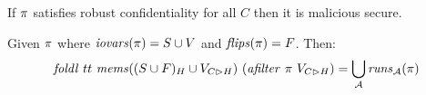 \begin{theorem}
  If $\pi$ satisfies robust confidentiality for all $C$ then it is malicious secure.
\end{theorem}

\begin{lemma}
  \label{lemma-aruns}
  Given $\pi$ where $\mathit{iovars}(\pi) = S \cup V$ and $\mathit{flips}(\pi) = F$. Then:
  $$
  \mathit{foldl}\ {tt}\ \mathit{mems}((S \cup F)_H \cup V_{C \rhd H})\ (\mathit{afilter}\ \pi\ V_{C \rhd H}) = \bigcup_{\mathcal{A}}  \mathit{runs}_{\mathcal{A}}(\pi)
  $$
\end{lemma}


\begin{comment}
\section{Robust Declassification}

\begin{definition}[Confidentiality Modulo Output]
  \label{definition-CMO}
  We say that a program  $\prog$ satisfies \emph{confidentiality modulo output}
  iff for all $H$ and $C$ with $|C|\le|H|$ and 
  $\store_1,\store_2 \in \mems(S)$ we have:
  $$
  (\store_1 =_C \store_2 \ \wedge \ 
  (\condd{\progtt(\prog)}{\{ \outv \}}{\store_1} = \condd{\progtt(\prog)}{\{ \outv \}}{\store_2}))
  \implies 
  (\condd{\progtt(\prog)}{V_C}{\store_1} = \condd{\progtt(\prog)}{V_C}{\store_2})
  $$
  where $\iov(\prog) = (S,V)$.%
\end{definition}

\begin{definition}[Robust Declassification]
  \label{definition-RD}
  We say that a program  $\prog$ satisfies \emph{robust declassification}
  iff for all $H$ and $C$ with $|C|\le|H|$ and 
  $\store_1,\store_2 \in \mems(S)$ we have:
  $$
  (\store_1 =_H \store_2 \ \wedge \ 
  (\condd{\progtt(\prog)}{\{ \outv \}}{\store_1} = \condd{\progtt(\prog)}{\{ \outv \}}{\store_2}))
  \implies 
  (\condd{\progtt(\prog)}{V_C}{\store_1} = \condd{\progtt(\prog)}{V_C}{\store_2})
  $$
  where $\iov(\prog) = (S,V)$.%
\end{definition}


\begin{theorem}
  If $\prog$ satisfies robust declassification, then
  $\prog_{\adversary}$ satisfies confidentiality
  modulo output for all $\adversary$. 
\end{theorem}

\begin{theorem}
  If $\prog$ satisfies robust declassification then it is malicious secure.
\end{theorem}
\end{comment}

